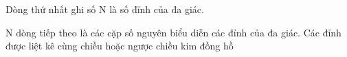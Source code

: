 Dòng thứ nhất ghi số N là số đỉnh của đa giác.  

   N dòng tiếp theo là các cặp số nguyên biểu diễn các đỉnh của đa giác. Các đỉnh được liệt kê cùng chiều hoặc ngược chiều kim đồng hồ  

\